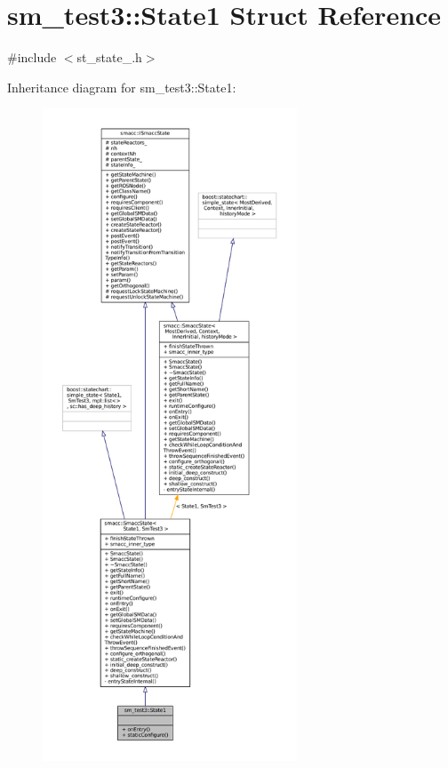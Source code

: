 \hypertarget{structsm__test3_1_1State1}{}\section{sm\+\_\+test3\+:\+:State1 Struct Reference}
\label{structsm__test3_1_1State1}


{\ttfamily \#include $<$st\+\_\+state\+\_.\+h$>$}



Inheritance diagram for sm\+\_\+test3\+:\+:State1\+:
\nopagebreak
\begin{figure}[H]
\begin{center}
\leavevmode
\includegraphics[height=550pt]{structsm__test3_1_1State1__inherit__graph}
\end{center}
\end{figure}


